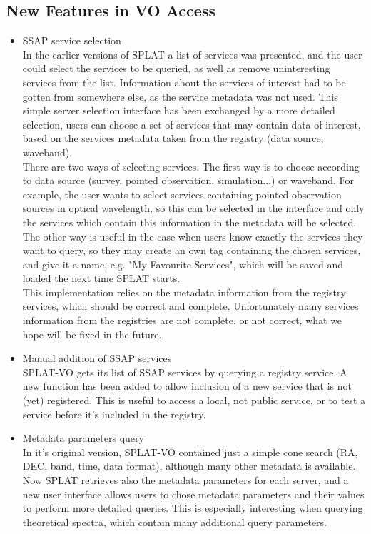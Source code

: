 \documentclass[final,authoryear,5p,times,twocolumn]{elsarticle}
\begin{document}
\subsection{New Features in VO Access}
\begin{itemize}
\item{ SSAP service selection}\\
In the earlier versions of SPLAT a list of services was presented, and the user could select the services to be queried, as well as remove uninteresting services from the list. Information about the services of interest had to be gotten from somewhere else, as the service metadata was not used.
This simple server selection interface has been exchanged by a more detailed selection, users can choose a set of services that may contain data of interest, based on the services metadata taken from the registry (data source, waveband).\\
There are two ways of selecting services. The first way is to choose according to data source (survey, pointed observation, simulation...) or waveband. 
For example, the user wants to select services containing pointed observation sources in optical wavelength, so this can be selected in the interface and only the services which contain this information in the metadata will be selected.
The other way is useful in the case when users know exactly the services they want to query, so they may create an own tag containing the chosen services, and give it a name, e.g. "My Favourite Services", which will be saved and loaded the next time SPLAT starts.\\
This implementation relies on the metadata information from the registry services, which should be correct and complete. Unfortunately many services information from the registries are not complete, or not correct, what we hope will be fixed in the future.



\item Manual addition of SSAP services\\
SPLAT-VO  gets  its list of SSAP services by querying a registry service.  A new function has been added to allow inclusion of a new service that is not (yet) registered. This is useful to access a local, not public service, or to test a service before it's included in the registry.

\item Metadata parameters query\\
In it's original version,  SPLAT-VO contained just a simple cone search (RA, DEC, band, time, data format), although many other metadata
is available.  Now SPLAT retrieves also the metadata parameters for each server, and a new user interface allows users to chose metadata parameters and their values to perform more detailed queries.  This is especially interesting when querying theoretical spectra, which contain many additional query parameters.


\end{itemize}
\end{document}
